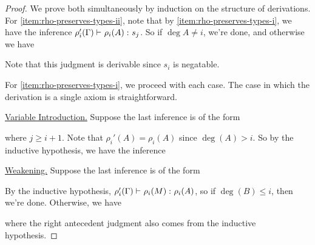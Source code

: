 \documentclass{article}
\begin{document}
\begin{proof}

We prove both simultaneously by induction on the structure of derivations.
For \autoref{item:rho-preserves-types-ii}, note that by \autoref{item:rho-preserves-types-i}, we have the inference
$
    \judgment {
       \rho_i'(\Gamma)
    }{
        \rho_i(A)
    }{
        s_j
    }
$.
So if $\deg A \not = i$, we're done, and otherwise we have
\begin{prooftree}
\end{prooftree}
Note that this judgment is derivable since $s_i$ is negatable.

For \autoref{item:rho-preserves-types-i}, we proceed with each case.
The case in which the derivation is a single axiom is straightforward.

\noindent\underline{Variable Introduction.}
Suppose the last inference is of the form
\begin{prooftree}
\end{prooftree}
where $j \geq i + 1$.
Note that $\rho_i'(A) = \rho_i(A)$ since $\deg(A) > i$.
So by the inductive hypothesis, we have the inference
\begin{prooftree}
\end{prooftree}

\noindent\underline{Weakening.}
Suppose the last inference is of the form
\begin{prooftree}
\end{prooftree}
By the inductive hypothesis,
$
    \judgment {
        \rho_i'(\Gamma)
    }{
        \rho_i(M)
    }{
        \rho_i(A)
    }
$,
so if $\deg(B) \leq i$, then we're done.
Otherwise, we have
\begin{prooftree}
\end{prooftree}
where the right antecedent judgment also comes from the inductive hypothesis.


\end{proof}
\end{document}
